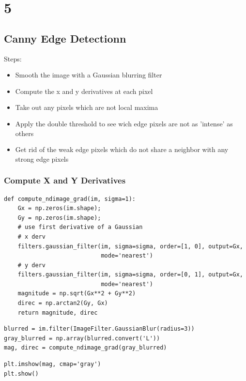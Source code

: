 \documentclass[11pt]{article}
\begin{document}
\section*{5}
\label{sec-5}

\subsection*{Canny Edge Detectionn}
\label{sec-5-1}

Steps:
\begin{itemize}
\item Smooth the image with a Gaussian blurring filter
\item Compute the x and y derivatives at each pixel
\item Take out any pixels which are not local maxima
\item Apply the double threshold to see wich edge pixels are not as 'intense' as
others
\item Get rid of the weak edge pixels which do not share a neighbor with any strong
edge pixels
\end{itemize}

\subsubsection*{Compute X and Y Derivatives}
\label{sec-5-1-1}

\begin{verbatim}
def compute_ndimage_grad(im, sigma=1):
    Gx = np.zeros(im.shape);
    Gy = np.zeros(im.shape);
    # use first derivative of a Gaussian
    # x derv
    filters.gaussian_filter(im, sigma=sigma, order=[1, 0], output=Gx,
                            mode='nearest')
    # y derv
    filters.gaussian_filter(im, sigma=sigma, order=[0, 1], output=Gx,
                            mode='nearest')
    magnitude = np.sqrt(Gx**2 + Gy**2)
    direc = np.arctan2(Gy, Gx)
    return magnitude, direc
\end{verbatim}


\begin{verbatim}
blurred = im.filter(ImageFilter.GaussianBlur(radius=3))
gray_blurred = np.array(blurred.convert('L'))
mag, direc = compute_ndimage_grad(gray_blurred)
\end{verbatim}


\begin{verbatim}
plt.imshow(mag, cmap='gray')
plt.show()
\end{verbatim}
\end{document}
